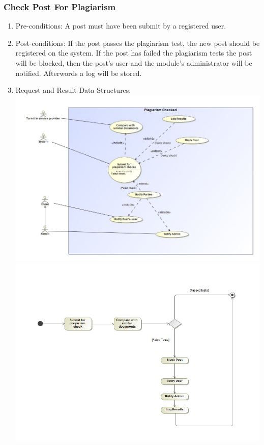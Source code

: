 \documentclass[hidelinks, 12pt, oneside]{article}
\begin{document}
\subsubsection{Check Post For Plagiarism}
\begin{enumerate}
 \item Pre-conditions: A post must have been submit by a registered user. 
 \\
 
 \item Post-conditions: If the post passes the plagiarism test, the new post should be registered on the system. If the post has failed the plagiarism tests the post will be blocked, then the post's user and the module's administrator will be notified. Afterwords a log will be stored. 
   \\
 \item Request and Result Data Structures:\\
  \includegraphics[scale=0.4]{plagiarismCheckUC}\\
 \includegraphics[scale=0.35]{plagiarismCheckAD} 
\end{enumerate}
\end{document}
